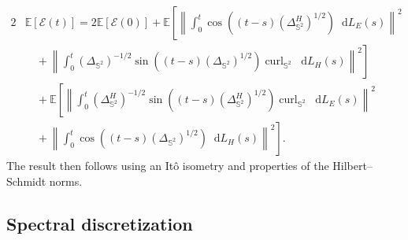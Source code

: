 \documentclass[11pt]{amsart}
\newcommand{\E}{{\mathbb E}}
\newcommand{\IS}{\mathbb{S}}
\newcommand{\cE}{\mathcal E}
\providecommand{\norm}[1]{\left\lVert#1\right\rVert}
\newcommand*\dd{\mathop{}\!\mathrm{d}}
\newcommand{\Deltalb}{\Delta_{\IS^2}}
\begin{document}
\begin{appendixproof}
\begin{align*}
		2&\E\left[\cE(t)\right] = 2\E\left[\cE(0)\right] + \E\left[\norm{ \int_0^t\cos((t-s)(\Deltalb^H)^{1/2})\dd L_E(s)}^2\right. \\
		&\quad+ \left.\norm{ \int_0^t(\Deltalb)^{-1/2}\sin((t-s)(\Deltalb)^{1/2})\operatorname{curl}_{\IS^2}\dd L_H(s)}^2\right]\\
		&\quad+ \E\left[ \norm{\int_0^t(\Deltalb^H)^{-1/2}\sin((t-s)(\Deltalb^H)^{1/2})\operatorname{curl}_{\IS^2}\dd L_E(s)}^2\right.\\
		&\quad+ \left.\norm{ \int_0^t\cos((t-s)(\Deltalb)^{1/2})\dd L_H(s)}^2\right].
	\end{align*}
	The result then follows using an It\^o isometry and properties of the Hilbert--Schmidt norms.
\end{appendixproof}

\subsection{Spectral discretization}
\end{document}
